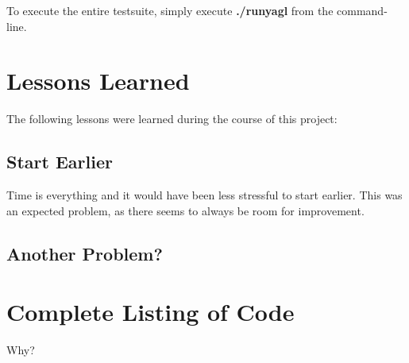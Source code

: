 \documentclass[12pt]{article}
\begin{document}
To execute the entire testsuite, simply execute \textbf{./runyagl} from the command-line.

\section{Lessons Learned}
The following lessons were learned during the course of this project:\\

\subsection{Start Earlier}
Time is everything and it would have been less stressful to start earlier. This was an expected problem, as there seems to always be room for improvement.

\subsection{Another Problem?}


\section{Complete Listing of Code}
Why?
\end{document}
